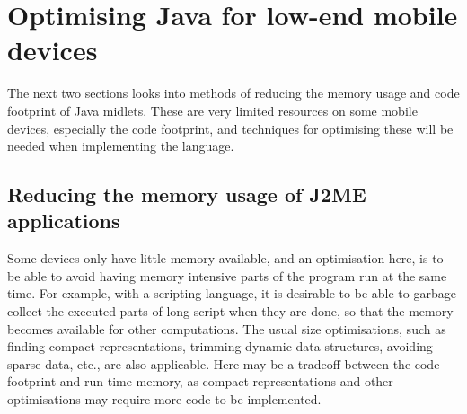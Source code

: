 \documentclass[11pt]{report}
\begin{document}
%
%
%
%
%

\section{Optimising Java for low-end mobile devices}
The next two sections looks into methods of reducing the memory usage and code footprint of Java midlets.
These are very limited resources on some mobile devices, especially the code footprint, and techniques for optimising these will be needed when implementing the language.

\subsection{Reducing the memory usage of J2ME applications}

Some devices only have little memory available,
and an optimisation here, is to be able to avoid having memory intensive parts of the program run at the same time. For example, with a scripting language, it is desirable to be able to garbage collect the executed parts of long script when they are done, so that the memory becomes available for other computations.
The usual size optimisations, such as finding compact representations, trimming dynamic data structures, avoiding sparse data, etc., are also applicable.
Here may be a tradeoff between the code footprint and run time memory, as compact representations and other optimisations may require more code to be implemented.
\end{document}

